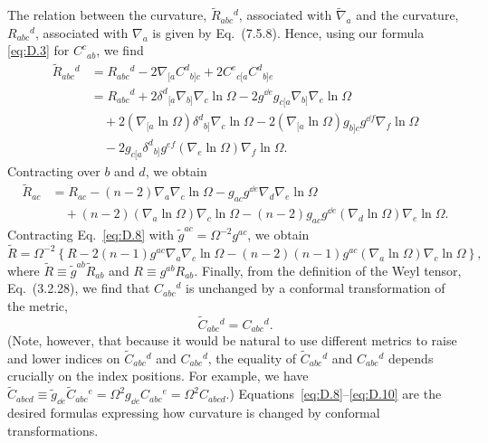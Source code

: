 The relation between the curvature, \(\widetilde R_{abc}{}^d\), associated with
\(\widetilde\nabla_a\) and the curvature, \(R_{abc}{}^d\), associated with
\(\nabla_a\) is given by Eq.~(7.5.8). Hence, using our formula \eqref{eq:D.3} for
\(C^c{}_{ab}\), we find
\begin{equation}
\begin{aligned}
  \widetilde R_{abc}{}^d
  &=R_{abc}{}^d-2\nabla_{[a}C^d{}_{b]c}
  +2C^e{}_{c[a}C^d{}_{b]e}\\
  &=R_{abc}{}^d+2\delta^d{}_{[a}\nabla_{b]}\nabla_c\ln\Omega
  -2g^{\dd e}g_{c[a}\nabla_{b]}\nabla_e\ln\Omega\\
  &\quad+2(\nabla_{[a}\ln\Omega)\delta^d{}_{b]}\nabla_c\ln\Omega
  -2(\nabla_{[a}\ln\Omega)g_{b]c}g^{\dd f}\nabla_f\ln\Omega\\
  &\quad-2g_{c[a}\delta^d{}_{b]}g^{ef}
  (\nabla_e\ln\Omega)\nabla_f\ln\Omega.
\end{aligned}
  \tag{D.7}\label{eq:D.7}
\end{equation}
Contracting over \(b\) and \(d\), we obtain
\begin{equation}
\begin{aligned}
  \widetilde R_{ac}
  &=R_{ac}-(n-2)\nabla_a\nabla_c\ln\Omega
  -g_{ac}g^{\dd e}\nabla_d\nabla_e\ln\Omega\\
  &\quad+(n-2)(\nabla_a\ln\Omega)\nabla_c\ln\Omega
  -(n-2)g_{ac}g^{\dd e}(\nabla_d\ln\Omega)\nabla_e\ln\Omega.
\end{aligned}
  \tag{D.8}\label{eq:D.8}
\end{equation}
Contracting Eq.~\eqref{eq:D.8} with \(\widetilde g^{ac}=\Omega^{-2}g^{ac}\), we
obtain
\begin{equation}
  \widetilde R
  =\Omega^{-2}\left\{
  R-2(n-1)g^{ac}\nabla_a\nabla_c\ln\Omega
  -(n-2)(n-1)g^{ac}(\nabla_a\ln\Omega)\nabla_c\ln\Omega\right\},
  \tag{D.9}\label{eq:D.9}
\end{equation}
where \(\widetilde R\equiv\widetilde g^{ab}\widetilde R_{ab}\) and
\(R\equiv g^{ab}R_{ab}\). Finally, from the definition of the Weyl tensor,
Eq.~(3.2.28), we find that \(C_{abc}{}^d\) is unchanged by a conformal
transformation of the metric,
\begin{equation}
  \widetilde C_{abc}{}^d=C_{abc}{}^d.
  \tag{D.10}\label{eq:D.10}
\end{equation}
(Note, however, that because it would be natural to use different metrics to raise
and lower indices on \(\widetilde C_{abc}{}^d\) and \(C_{abc}{}^d\), the equality of
\(\widetilde C_{abc}{}^d\) and \(C_{abc}{}^d\) depends crucially on the index
positions. For example, we have
\(\widetilde C_{abcd}\equiv\widetilde g_{\dd e}\widetilde C_{abc}{}^e
=\Omega^2g_{\dd e}C_{abc}{}^e=\Omega^2C_{abcd}\).)
Equations~\eqref{eq:D.8}--\eqref{eq:D.10} are the desired formulas expressing how
curvature is changed by conformal transformations.

